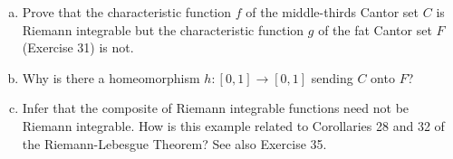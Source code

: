 \documentclass[a4paper, 12pt]{article}
\begin{document}
\begin{problem} [3.33]
\mbox{}
\begin{enumerate} [(a)]
    \vspace{-18pt}
    \item Prove that the characteristic function $f$ of the middle-thirds Cantor set $C$ is Riemann integrable but the characteristic function $g$ of the fat Cantor set $F$ (Exercise 31) is not.
    \item Why is there a homeomorphism $h: [0, 1] \to [0, 1]$ sending $C$ onto $F$?
    \item Infer that the composite of Riemann integrable functions need not be Riemann integrable. How is this example related to Corollaries 28 and 32 of the Riemann-Lebesgue Theorem? See also Exercise 35.
\end{enumerate}
\end{problem}
\end{document}

